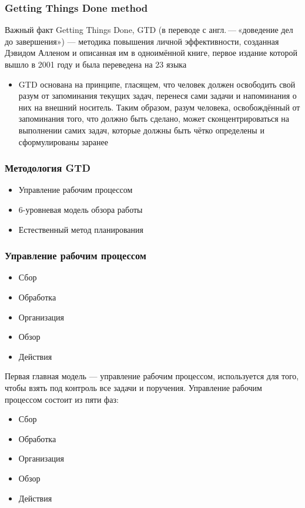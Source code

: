\documentclass{../industrial-development}
\begin{document}
\begin{frame} \frametitle{Getting Things Done method}
  \begin{block}{Важный факт}
    Getting Things Done, GTD (в переводе с англ. — «доведение дел до завершения») --- методика повышения личной эффективности, созданная Дэвидом Алленом и описанная им в одноимённой книге, первое издание которой вышло в 2001 году и была переведена на 23 языка
  \end{block}
  \begin{itemize}
  \item GTD основана на принципе, гласящем, что человек должен освободить свой разум от запоминания текущих задач, перенеся сами задачи и напоминания о них на внешний носитель. Таким образом, разум человека, освобождённый от запоминания того, что должно быть сделано, может сконцентрироваться на выполнении самих задач, которые должны быть чётко определены и сформулированы заранее
  \end{itemize}
\end{frame}

\begin{frame} \frametitle{Методология GTD}
  \begin{itemize}
  \item Управление рабочим процессом
  \item 6-уровневая модель обзора работы
  \item Естественный метод планирования
  \end{itemize}
\end{frame}

\begin{frame} \frametitle{Управление рабочим процессом}
  \begin{itemize}
  \item Сбор
  \item Обработка
  \item Организация
  \item Обзор
  \item Действия
  \end{itemize}
\end{frame}

\lecturenotes

Первая главная модель — управление рабочим процессом, используется для того, чтобы взять под контроль все задачи и поручения. Управление рабочим процессом состоит из пяти фаз:
\begin{itemize}
\item Сбор
\item Обработка
\item Организация
\item Обзор
\item Действия~\cite{GTDWikipedia}
\end{itemize}
\end{document}

